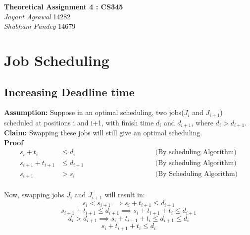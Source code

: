 \documentclass{article}
\begin{document}

\begin{center}
\textbf{\Large Theoretical Assignment 4 : CS345} \\
\textit{\large Jayant Agrawal}         14282 \\
\textit{\large Shubham Pandey}         14679
\end{center}

\section{Job Scheduling}
\subsection{Increasing Deadline time}
\label{incr}
\textbf{Assumption: } Suppose in an optimal scheduling, two jobs($J_i$ and $J_{i+1}$) scheduled at positions i and i+1, with finish time $d_i$ and $d_{i+1}$, where $d_i > d_{i+1}$. \\ 
\textbf{Claim: } Swapping these jobs will still give an optimal scheduling. \\ 
\textbf{Proof} \\ 
\begin{equation*}
\begin{aligned}
s_i + t_i &\leq d_i  &\hspace{4cm}  \text{(By scheduling Algorithm)} \\
s_{i+1} + t_{i+1} &\leq d_{i+1} &\hspace{4cm}   \text{(By scheduling Algorithm)} \\
s_{i+1} &> s_i &\hspace{4cm} \text{(By Scheduling Algorithm)}\\
\end{aligned}
\end{equation*}

Now, swapping jobs $J_i$ and $J_{i+1}$ will result in:
$$ s_i < s_{i+1} \implies s_i + t_{i+1} \leq d_{i+1} $$
$$ s_{i+1} + t_{i+1} \leq d_{i+1} \implies   s_i + t_{i+1} +t_{i} \leq d_{i+1} $$ 
$$ d_i > d_{i+1}  \implies s_i + t_{i+1} +t_{i} \leq d_{i+1} \leq d_i $$
$$ s_i + t_{i+1} +t_{i} \leq d_{i} $$
\end{document}
